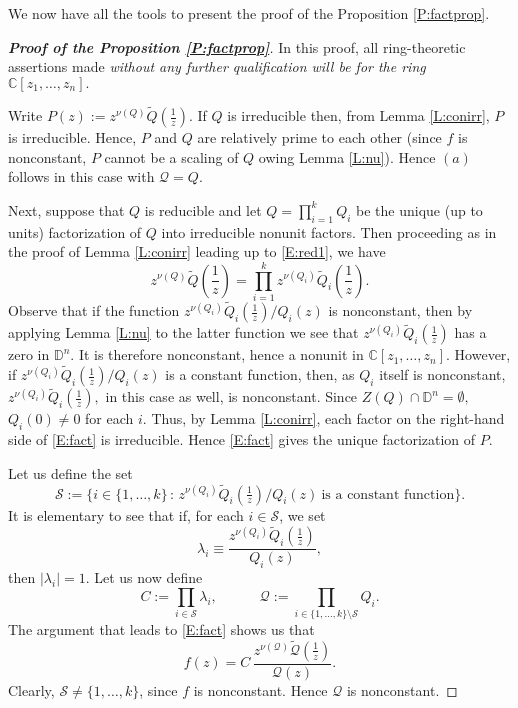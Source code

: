 \documentclass[11pt, reqno]{amsart}
\numberwithin{equation}{section}
\theoremstyle{definition}
\theoremstyle{remark}
\theoremstyle{plain}
\begin{document}
We now have all the tools to present the proof of the Proposition \ref{P:factprop}.

\begin{proof}[{\bf Proof of the Proposition \ref{P:factprop}}]
In this proof, all ring-theoretic assertions made {\em without any further qualification will be
for the ring ${\mathbb{C}}[z_1,\ldots,z_n].$}
\smallskip

Write $P(z):=z^{\nu(Q)}\widetilde{Q}(\frac{1}{z}).$
If $Q$ is irreducible then, from Lemma \ref{L:conirr}, $P$ is irreducible. Hence, $P$ and $Q$ are relatively 
prime to each other (since $f$ is nonconstant, $P$ cannot be a scaling of $Q$ owing Lemma \ref{L:nu}).
Hence $(a)$ follows in this case with ${\mathcal{Q}} = Q$.
\smallskip

Next, suppose that $Q$ is reducible and let $Q = \prod_{i=1}^{k}Q_i$ be the unique (up to units) 
factorization of $Q$ into irreducible nonunit factors. Then proceeding as in the proof of Lemma \ref{L:conirr}
leading up to \eqref{E:red1}, we have
\begin{equation}
z^{\nu(Q)}\widetilde{Q}\left(\frac{1}{z}\right)=
\prod_{i=1}^{k} z^{\nu(Q_i)}\widetilde{Q}_{i}\left(\frac{1}{z}\right).\label{E:fact}
\end{equation}
Observe that if the function ${z^{\nu(Q_i)}\widetilde{Q}_i(\frac{1}{z})}/Q_i(z)$ is nonconstant, then
by applying Lemma \ref{L:nu} to the latter function we see that $z^{\nu({Q_i})}\widetilde{Q}_{i}(\frac{1}{z})$
has a zero in ${\mathbb{D}}^n.$ It is therefore nonconstant,
hence a nonunit in ${\mathbb{C}}[z_1,\ldots,z_n].$ However, if ${z^{\nu(Q_i)}\widetilde{Q}_i(\frac{1}{z})}/Q_i(z)$
is a constant function, then, as $Q_i$ itself is nonconstant,
$z^{\nu({Q_i})}\widetilde{Q}_{i}(\frac{1}{z}),$ in this case as well, is nonconstant.
Since $Z(Q)\cap{\mathbb{D}}^n=\emptyset,$ $Q_{i}(0)\not=0$ for each $i.$ 
Thus, by Lemma \ref{L:conirr}, each factor on the right-hand side of \eqref{E:fact} is irreducible.
Hence \eqref{E:fact} gives the unique factorization of $P$. 
\smallskip

Let us define the set
\[
 \mathcal{S}:=\{i\in \{1,\dots, k\}\,:\,{z^{\nu(Q_i)}\widetilde{Q}_i(\tfrac{1}{z})}/Q_i(z) \ \text{is a constant function}\}.
\]
It is elementary to see that if, for each $i\in \mathcal{S}$, we set
\[
 \lambda_i \equiv \frac{z^{\nu(Q_i)}\widetilde{Q}_i(\frac{1}{z})}{Q_i(z)},
\]
then $|\lambda_i| = 1$. Let us now define
\[
 C := \prod_{i\in \mathcal{S}}\lambda_i, \qquad\quad
 {\mathcal{Q}} := \prod_{i\in \{1,\dots, k\}\setminus\mathcal{S}}\!\!Q_i.
\]
The argument that leads to \eqref{E:fact} shows us that
\begin{equation}
 f(z) = C\,\frac{z^{\nu({\mathcal{Q}})}\widetilde{\mathcal{Q}}(\frac{1}{z})}{{\mathcal{Q}}(z)}. \label{E:newform}
\end{equation}
Clearly, $\mathcal{S}\neq \{1,\dots, k\}$, since $f$ is nonconstant. Hence ${\mathcal{Q}}$ is nonconstant. 
\smallskip


\end{proof}
\end{document}
